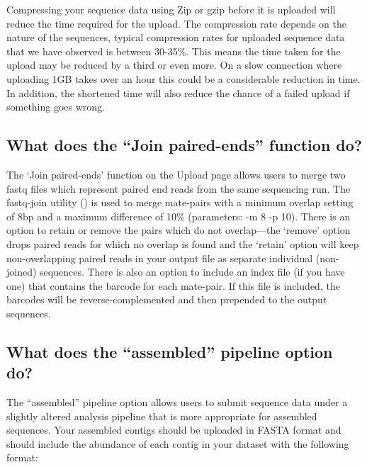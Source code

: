 \documentclass[letterpaper,10pt,english]{sphinxmanual}
\begin{document}
Compressing your sequence data using Zip or gzip before it is uploaded
will reduce the time required for the upload. The compression rate
depends on the nature of the sequences, typical compression rates for
uploaded sequence data that we have observed is between 30-35\%. This
means the time taken for the upload may be reduced by a third or even
more. On a slow connection where uploading 1GB takes over an hour this
could be a considerable reduction in time. In addition, the shortened
time will also reduce the chance of a failed upload if something goes
wrong.


\subsection{What does the “Join paired-ends” function do?}
\label{\detokenize{user_manual:what-does-the-join-paired-ends-function-do}}
The ‘Join paired-ends’ function on the Upload page allows users to merge
two fastq files which represent paired end reads from the same
sequencing run. The fastq-join utility
() is used to merge
mate-pairs with a minimum overlap setting of 8bp and a maximum
difference of 10\% (parameters: -m 8 -p 10). There is an option to retain
or remove the pairs which do not overlap—the ‘remove’ option drops
paired reads for which no overlap is found and the ‘retain’ option will
keep non-overlapping paired reads in your output file as separate
individual (non-joined) sequences. There is also an option to include an
index file (if you have one) that contains the barcode for each
mate-pair. If this file is included, the barcodes will be
reverse-complemented and then prepended to the output sequences.


\subsection{What does the “assembled” pipeline option do?}
\label{\detokenize{user_manual:what-does-the-assembled-pipeline-option-do}}
The “assembled” pipeline option allows users to submit sequence data
under a slightly altered analysis pipeline that is more appropriate for
assembled sequences. Your assembled contigs should be uploaded in FASTA
format and should include the abundance of each contig in your dataset
with the following format:

\begin{sphinxVerbatim}[commandchars=\\\{\}]
\PYG{p}{[}\PYG{p}{]}
\PYG{p}{[}\PYG{p}{]}
\end{sphinxVerbatim}
\end{document}
